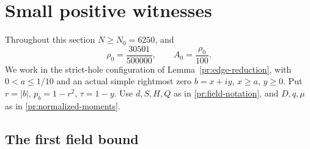 \section{Small positive witnesses}\label{sec:small}

Throughout this section $N\ge N_0=6250$, and
\[
 \rho_0=\frac{30501}{500000},\qquad A_0=\frac{\rho_0}{100}.
\]
We work in the strict-hole configuration of
Lemma~\ref{pr:edge-reduction}, with $0<a\le1/10$ and an actual
simple rightmost zero $b=x+iy$, $x\ge a$, $y\ge0$.
Put $r=|b|$, $p_b=1-r^2$, $\tau=1-y$.
Use $d,S,H,Q$ as in \eqref{pr:field-notation}, and
$D,q,\mu$ as in \eqref{pr:normalized-moments}.

\subsection{The first field bound}

